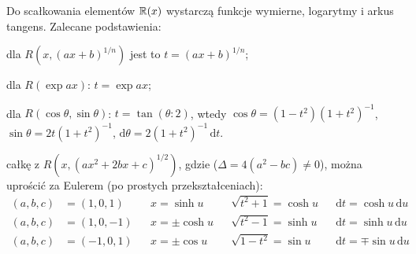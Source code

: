Do scałkowania elementów  $\mathbb{R}(x)$ wystarczą funkcje wymierne, logarytmy i arkus tangens.
Zalecane podstawienia:
\begin{enumx}
\item dla $R(x, (ax+b)^{1/n})$ jest to $t = (ax+b)^{1/n}$;
\item dla $R(\exp ax)$: $t = \exp ax$;
\item dla $R(\cos \theta, \sin \theta)$: $t = \tan  (\theta :2)$, wtedy $\cos \theta = (1-t^2)(1+t^2)^{-1}$, $\sin \theta = 2t (1+t^2)^{-1}$, $\textrm{d}\theta = 2 (1+t^2)^{-1} \,\textrm{d}t$.
\item całkę z $R(x, (ax^2 + 2bx + c)^{1/2})$, gdzie ($\Delta = 4(a^2 - bc) \neq 0$), można uprościć za Eulerem (po prostych przekształceniach):
\begin{align*}
(a, b, c) & = (1, 0, 1) & & x = \sinh u & & \sqrt{t^2 + 1} = \cosh u & & \textrm{d}t = \cosh u \, \textrm{d} u \\
(a, b, c) & = (1, 0, -1) & & x = \pm \cosh u & & \sqrt{t^2 - 1} = \sinh u & & \textrm{d}t = \sinh u \, \textrm{d} u \\
(a, b, c) & = (-1, 0, 1) & & x = \pm \cos u & & \sqrt{1 - t^2} = \sin u & & \textrm{d}t = \mp \sin u \, \textrm{d} u
\end{align*}
\end{enumx}

